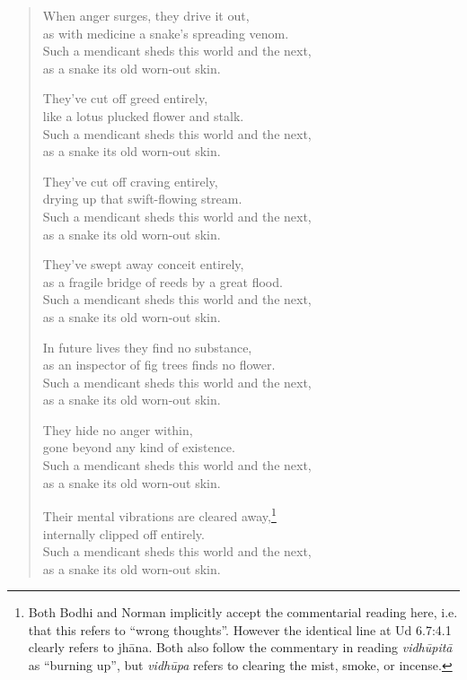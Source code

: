 \documentclass[12pt,openany]{book}%
\begin{document}
\begin{verse}%
When anger surges, they drive it out, \\
as with medicine a snake’s spreading venom. \\
Such a mendicant sheds this world and the next, \\
as a snake its old worn-out skin. 

They’ve cut off greed entirely, \\
like a lotus plucked flower and stalk. \\
Such a mendicant sheds this world and the next, \\
as a snake its old worn-out skin. 

They’ve cut off craving entirely, \\
drying up that swift-flowing stream. \\
Such a mendicant sheds this world and the next, \\
as a snake its old worn-out skin. 

They’ve swept away conceit entirely, \\
as a fragile bridge of reeds by a great flood. \\
Such a mendicant sheds this world and the next, \\
as a snake its old worn-out skin. 

In future lives they find no substance, \\
as an inspector of fig trees finds no flower. \\
Such a mendicant sheds this world and the next, \\
as a snake its old worn-out skin. 

They hide no anger within, \\
gone beyond any kind of existence. \\
Such a mendicant sheds this world and the next, \\
as a snake its old worn-out skin. 

Their mental vibrations are cleared away,\footnote{Both Bodhi and Norman implicitly accept the commentarial reading here, i.e. that this refers to “wrong thoughts”. However the identical line at Ud 6.7:4.1 clearly refers to \textsanskrit{jhāna}. Both also follow the commentary in reading \textit{\textsanskrit{vidhūpitā}} as “burning up”, but \textit{\textsanskrit{vidhūpa}} refers to clearing the mist, smoke, or incense. } \\
internally clipped off entirely. \\
Such a mendicant sheds this world and the next, \\
as a snake its old worn-out skin. 


\end{verse}
\end{document}
